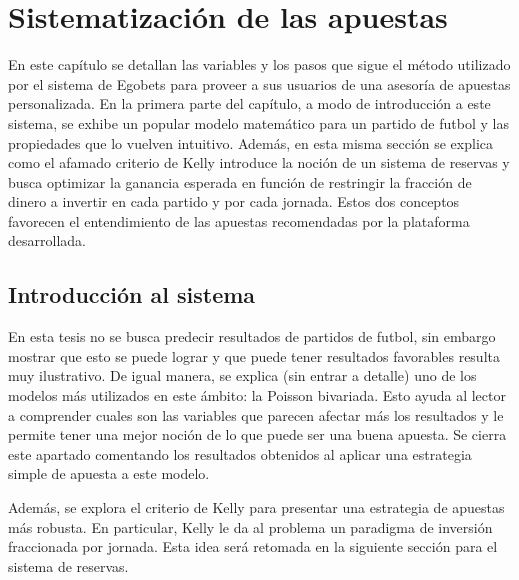 \graphicspath{{/Users/brunomedina/Dropbox/Tesis-Egobets/egobets-notas/resources/}}

\chapter{Sistematización de las apuestas}
\label{chap:mate}


En este capítulo se detallan las variables y los pasos que sigue el método utilizado por el sistema de Egobets para proveer a sus usuarios de una asesoría de apuestas personalizada. En la primera parte del capítulo, a modo de introducción a este sistema, se exhibe un popular modelo matemático para un partido de futbol y las propiedades que lo vuelven intuitivo. Además, en esta misma sección se explica como el afamado criterio de Kelly introduce la noción de un sistema de reservas y busca optimizar la ganancia esperada en función de restringir la fracción de dinero a invertir en cada partido y por cada jornada. Estos dos conceptos favorecen el entendimiento de las apuestas recomendadas por la plataforma desarrollada.

\section{Introducción al sistema}
\label{sec:evidencia}

En esta tesis no se busca predecir resultados de partidos de futbol, sin embargo mostrar que esto se puede lograr y que puede tener resultados favorables resulta muy ilustrativo. De igual manera, se explica (sin entrar a detalle) uno de los modelos más utilizados en este ámbito: la Poisson bivariada. Esto ayuda al lector a comprender cuales son las variables que parecen afectar más los resultados y le permite tener una mejor noción de lo que puede ser una buena apuesta. Se cierra este apartado comentando los resultados obtenidos al aplicar una estrategia simple de apuesta a este modelo.

Además, se explora el criterio de Kelly para presentar una estrategia de apuestas más robusta. En particular, Kelly le da al problema un paradigma de inversión fraccionada por jornada. Esta idea será retomada en la siguiente sección para el sistema de reservas.

